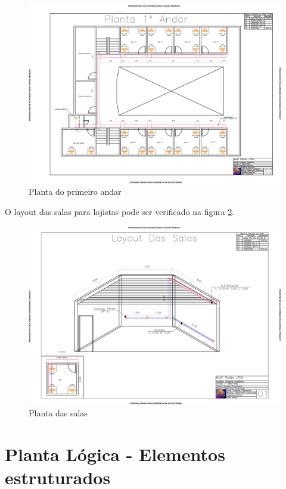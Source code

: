 \documentclass[	DIV=calc,%
							paper=a4,%
							fontsize=12pt,%
							onecolumn]{scrartcl}	 					%
\begin{document}
\begin{figure}
\centering
\includegraphics[width=\textwidth]{L3}
\caption{Planta do primeiro andar}
\label{L3}
\end{figure}

O layout das salas para lojistas pode ser verificado na figura \ref{L2}.

\begin{figure}
\centering
\includegraphics[width=\textwidth]{L2}
\caption{Planta das salas}
\label{L2}
\end{figure}

\section{Planta Lógica - Elementos estruturados}
\end{document}
